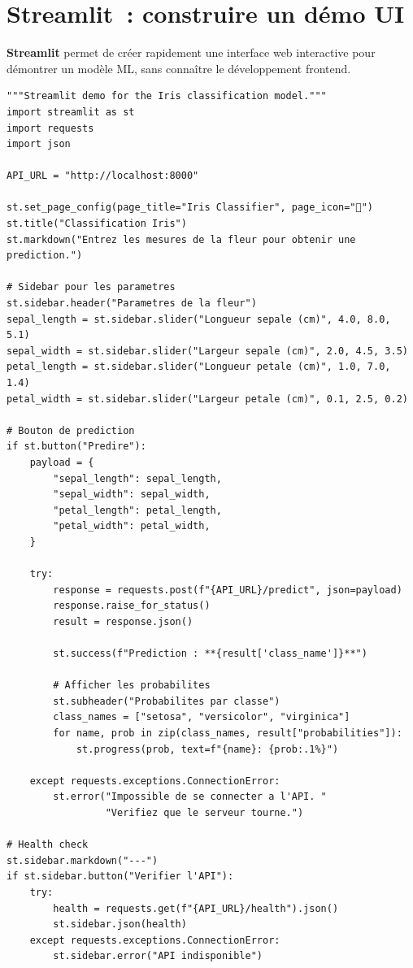 \section{Streamlit~: construire un d\'emo UI}
\label{sec:streamlit}

\textbf{Streamlit} permet de cr\'eer rapidement une
interface web interactive pour d\'emontrer un mod\`ele ML, sans conna\^itre
le d\'eveloppement frontend.

\begin{codeblock}[title=\textbf{streamlit\_app.py --- D\'emo interactive}]
\begin{verbatim}
"""Streamlit demo for the Iris classification model."""
import streamlit as st
import requests
import json

API_URL = "http://localhost:8000"

st.set_page_config(page_title="Iris Classifier", page_icon="🌸")
st.title("Classification Iris")
st.markdown("Entrez les mesures de la fleur pour obtenir une prediction.")

# Sidebar pour les parametres
st.sidebar.header("Parametres de la fleur")
sepal_length = st.sidebar.slider("Longueur sepale (cm)", 4.0, 8.0, 5.1)
sepal_width = st.sidebar.slider("Largeur sepale (cm)", 2.0, 4.5, 3.5)
petal_length = st.sidebar.slider("Longueur petale (cm)", 1.0, 7.0, 1.4)
petal_width = st.sidebar.slider("Largeur petale (cm)", 0.1, 2.5, 0.2)

# Bouton de prediction
if st.button("Predire"):
    payload = {
        "sepal_length": sepal_length,
        "sepal_width": sepal_width,
        "petal_length": petal_length,
        "petal_width": petal_width,
    }

    try:
        response = requests.post(f"{API_URL}/predict", json=payload)
        response.raise_for_status()
        result = response.json()

        st.success(f"Prediction : **{result['class_name']}**")

        # Afficher les probabilites
        st.subheader("Probabilites par classe")
        class_names = ["setosa", "versicolor", "virginica"]
        for name, prob in zip(class_names, result["probabilities"]):
            st.progress(prob, text=f"{name}: {prob:.1%}")

    except requests.exceptions.ConnectionError:
        st.error("Impossible de se connecter a l'API. "
                 "Verifiez que le serveur tourne.")

# Health check
st.sidebar.markdown("---")
if st.sidebar.button("Verifier l'API"):
    try:
        health = requests.get(f"{API_URL}/health").json()
        st.sidebar.json(health)
    except requests.exceptions.ConnectionError:
        st.sidebar.error("API indisponible")
\end{verbatim}
\end{codeblock}


